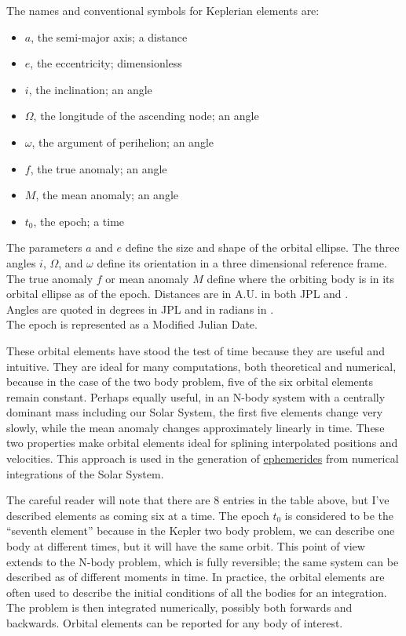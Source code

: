 \begin{samepage}
The names and conventional symbols for Keplerian elements are:
\begin{itemize}
\item $a$, the semi-major axis; a distance
\item $e$, the eccentricity; dimensionless
\item $i$, the inclination; an angle
\item $\Omega$, the longitude of the ascending node; an angle
\item $\omega$, the argument of perihelion; an angle
\item $f$, the true anomaly; an angle
\item $M$, the mean anomaly; an angle
\item $t_0$, the epoch; a time
\end{itemize}
\end{samepage}
The parameters $a$ and $e$ define the size and shape of the orbital ellipse.
The three angles $i$, $\Omega$, and $\omega$ define its orientation in a three dimensional reference frame.
The true anomaly $f$ or mean anomaly $M$ define where the orbiting body is in its orbital ellipse as of the epoch.
Distances are in A.U. in both JPL and .  \\
Angles are quoted in degrees in JPL and in radians in .\\
The epoch is represented as a Modified Julian Date.

These orbital elements have stood the test of time because they are useful and intuitive.
They are ideal for many computations, both theoretical and numerical, because in the case of the two body problem, five of the six orbital elements remain constant.
Perhaps equally useful, in an N-body system with a centrally dominant mass including our Solar System,
the first five elements change very slowly, while the mean anomaly changes approximately linearly in time.
These two properties make orbital elements ideal for splining interpolated positions and velocities.
This approach is used in the generation of \href{https://en.wikipedia.org/wiki/Ephemeris}{ephemerides} from numerical integrations of the Solar System.

The careful reader will note that there are 8 entries in the table above, but I've described elements as coming six at a time.
The epoch $t_0$ is considered to be the ``seventh element'' because in the Kepler two body problem, we can describe one body at different times, but it will have the same orbit.
This point of view extends to the N-body problem, which is fully reversible; the same system can be described as of different moments in time.
In practice, the orbital elements are often used to describe the initial conditions of all the bodies for an integration.
The problem is then integrated numerically, possibly both forwards and backwards.
Orbital elements can be reported for any body of interest.

